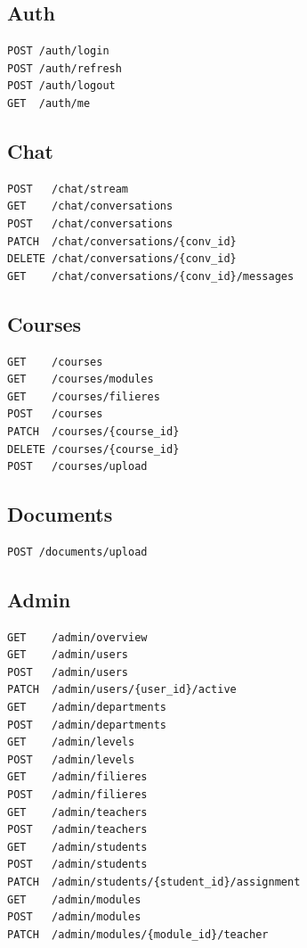 \documentclass[11pt,a4paper]{article}
\begin{document}
\subsection{Auth}

\begin{lstlisting}
POST /auth/login
POST /auth/refresh
POST /auth/logout
GET  /auth/me
\end{lstlisting}

\subsection{Chat}

\begin{lstlisting}
POST   /chat/stream
GET    /chat/conversations
POST   /chat/conversations
PATCH  /chat/conversations/{conv_id}
DELETE /chat/conversations/{conv_id}
GET    /chat/conversations/{conv_id}/messages
\end{lstlisting}

\subsection{Courses}

\begin{lstlisting}
GET    /courses
GET    /courses/modules
GET    /courses/filieres
POST   /courses
PATCH  /courses/{course_id}
DELETE /courses/{course_id}
POST   /courses/upload
\end{lstlisting}

\subsection{Documents}

\begin{lstlisting}
POST /documents/upload
\end{lstlisting}

\subsection{Admin}

\begin{lstlisting}
GET    /admin/overview
GET    /admin/users
POST   /admin/users
PATCH  /admin/users/{user_id}/active
GET    /admin/departments
POST   /admin/departments
GET    /admin/levels
POST   /admin/levels
GET    /admin/filieres
POST   /admin/filieres
GET    /admin/teachers
POST   /admin/teachers
GET    /admin/students
POST   /admin/students
PATCH  /admin/students/{student_id}/assignment
GET    /admin/modules
POST   /admin/modules
PATCH  /admin/modules/{module_id}/teacher
\end{lstlisting}
\end{document}
